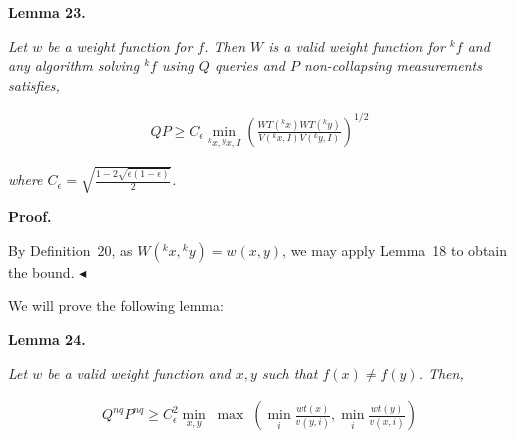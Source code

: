 \documentclass[10pt,a4paper]{article}
\begin{document}


\par\medskip\noindent\textbf{
\textbf{Lemma 23}\textbf{.}
}\par



\emph{Let $w$ be a weight function for $f$. Then $W$ is a valid weight function for ${}^{k}f$ and any algorithm solving ${}^{k}f$ using $Q$ queries and $P$ non-collapsing measurements satisfies,}\par


\[\begin{gathered}
\displaystyle QP\geq C_{\epsilon}\min_{{}^{k}x,{}^{y}x,I}\left(\frac{WT({}^{k}x)WT({}^{k}y)}{V({}^{k}x,I)V({}^{k}y,I)}\right)^{1/2}
\end{gathered}\]


\emph{where $C_{\epsilon}=\sqrt{\frac{1-2\sqrt{\epsilon(1-\epsilon)}}{2}}$.}\par






\par\medskip\noindent\textbf{Proof.}\par




By Definition 20, as $W({}^{k}x,{}^{k}y)=w(x,y)$, we may apply Lemma 18 to obtain the bound.
$\blacktriangleleft$\par




We will prove the following lemma:\par





\par\medskip\noindent\textbf{
\textbf{Lemma 24}\textbf{.}
}\par



\emph{Let $w$ be a valid weight function and $x,y$ such that $f(x)\neq f(y)$. Then,}\par


\[\begin{gathered}
\displaystyle Q^{nq}P^{nq}\geq C^{2}_{\epsilon}\min_{x,y}\;\max\;\left(\min_{i}\frac{wt(x)}{v(y,i)},\min_{i}\frac{wt(y)}{v(x,i)}\right)
\end{gathered}\]



\end{document}
